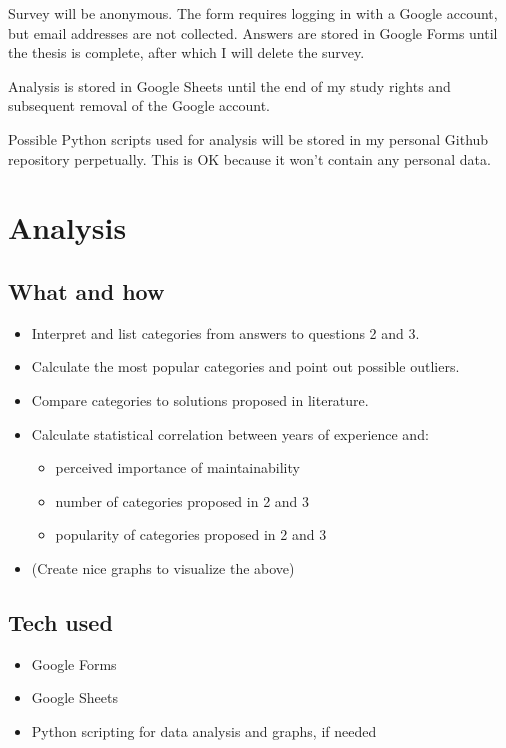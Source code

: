 \documentclass[utf8,english]{gradu3}
\begin{document}
Survey will be anonymous.
The form requires logging in with a Google account, but email addresses are not collected.
Answers are stored in Google Forms until the thesis is complete,
after which I will delete the survey.

Analysis is stored in Google Sheets until the end of my study rights and
subsequent removal of the Google account.

Possible Python scripts used for analysis will be stored in my personal Github repository
perpetually.
This is OK because it won't contain any personal data.


\chapter{Analysis}

\section{What and how}
\begin{itemize}
  \item Interpret and list categories from answers to questions 2 and 3.
  \item Calculate the most popular categories and point out possible outliers.
  \item Compare categories to solutions proposed in literature.
  \item Calculate statistical correlation between years of experience and:
        \begin{itemize}
          \item perceived importance of maintainability
          \item number of categories proposed in 2 and 3
          \item popularity of categories proposed in 2 and 3
        \end{itemize}
  \item (Create nice graphs to visualize the above)
\end{itemize}

\section{Tech used}
\begin{itemize}
  \item Google Forms
  \item Google Sheets
  \item Python scripting for data analysis and graphs, if needed
\end{itemize}


\printbibliography
\end{document}
